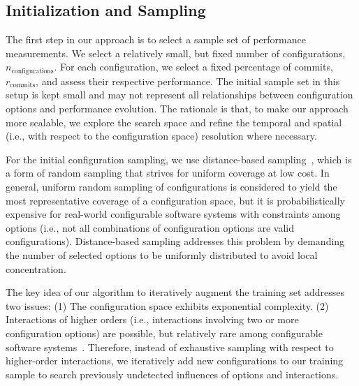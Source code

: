 \documentclass[sigconf]{acmart}
\begin{document}
	\subsection{Initialization and Sampling}\label{sec:initialization}
	The first step in our approach is to select a sample set of performance measurements. 
	We select a relatively small, but fixed number of configurations, $n_\text{configurations}$. For each configuration, we select a fixed percentage of commits, $r_\text{commits}$, and assess their respective performance.
	The initial sample set in this setup is kept small and may not represent all relationships between configuration options and performance evolution. 
	The rationale is that, to make our approach more scalable, we explore the search space and refine the temporal and  spatial (i.e., with respect to the configuration space) resolution where necessary. 

	For the initial configuration sampling, we use distance-based  sampling~\cite{kaltenecker_distance-based_2019}, which is a form of random sampling that strives for uniform coverage at low cost. 
	In general, uniform random sampling of configurations is considered to yield the most representative coverage of a configuration space, but it is probabilistically expensive for real-world configurable software systems with constraints among options (i.e., not all combinations of configuration options are valid configurations). 
	Distance-based sampling addresses this problem by demanding the number of selected options to be uniformly distributed to avoid local concentration. 

	The key idea of our algorithm to iteratively augment the training set addresses two issues: (1) The configuration space exhibits exponential complexity. 
	(2) Interactions of higher orders (i.e., interactions involving two or more configuration options) are possible, but relatively rare among configurable software systems~\cite{kolesnikov_relation_2019,kolesnikov_tradeoffs_2019}. Therefore, instead of exhaustive sampling with respect to higher-order interactions, we iteratively add new configurations to our training sample to search previously undetected influences of options and interactions.
	
\end{document}
